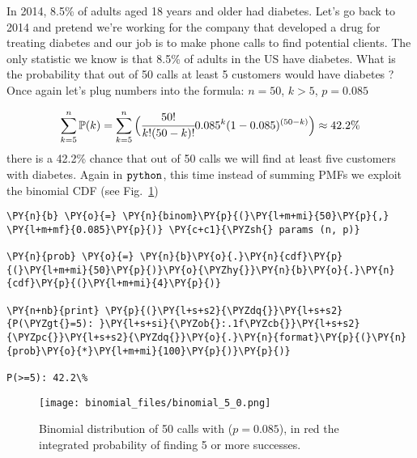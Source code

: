In 2014, 8.5\% of adults aged 18 years and older had diabetes. Let's go
back to 2014 and pretend we're working for the company that developed a
drug for treating diabetes and our job is to make phone calls to find
potential clients. The only statistic we know is that 8.5\% of adults in
the US have diabetes. What is the probability that out of 50 calls at
least 5 customers would have diabetes ? Once again let's plug numbers
into the formula: \(n = 50\), \(k > 5\), \(p = 0.085\)

\[\sum_{k=5}^{n}\mathbb{P}(k) = \sum_{k=5}^{n}\Big(\cfrac{50!}{k!(50 - k)!}0.085^{k}(1-0.085)^{(50-k)}\Big) \approx 42.2\% \]
there is a 42.2\% chance that out of 50 calls we will find at least five
customers with diabetes. Again in \(\tt{python}\), this time instead of
summing PMFs we exploit the binomial CDF (see Fig.~\ref{fig:binomial_cdf})

\begin{tcolorbox}[breakable, size=fbox, boxrule=1pt, pad at break*=1mm,colback=cellbackground, colframe=cellborder]
\begin{Verbatim}[commandchars=\\\{\}]
\PY{n}{b} \PY{o}{=} \PY{n}{binom}\PY{p}{(}\PY{l+m+mi}{50}\PY{p}{,} \PY{l+m+mf}{0.085}\PY{p}{)} \PY{c+c1}{\PYZsh{} params (n, p)}

\PY{n}{prob} \PY{o}{=} \PY{n}{b}\PY{o}{.}\PY{n}{cdf}\PY{p}{(}\PY{l+m+mi}{50}\PY{p}{)}\PY{o}{\PYZhy{}}\PY{n}{b}\PY{o}{.}\PY{n}{cdf}\PY{p}{(}\PY{l+m+mi}{4}\PY{p}{)}

\PY{n+nb}{print} \PY{p}{(}\PY{l+s+s2}{\PYZdq{}}\PY{l+s+s2}{P(\PYZgt{}=5): }\PY{l+s+si}{\PYZob{}:.1f\PYZcb{}}\PY{l+s+s2}{\PYZpc{}}\PY{l+s+s2}{\PYZdq{}}\PY{o}{.}\PY{n}{format}\PY{p}{(}\PY{n}{prob}\PY{o}{*}\PY{l+m+mi}{100}\PY{p}{)}\PY{p}{)}

P(>=5): 42.2\%
\end{Verbatim}
\end{tcolorbox}

    \begin{figure}[htb]
    \centering
    \texttt{[image: binomial\_files/binomial\_5\_0.png]}
    \caption{Binomial distribution of 50 calls with ($p=0.085$), in red the integrated probability of finding 5 or more successes.}
    \label{fig:binomial_cdf}
    \end{figure}
    